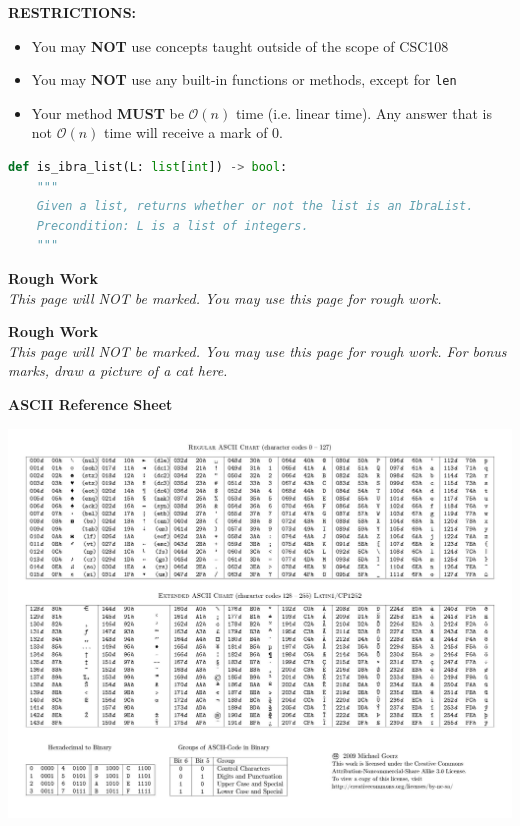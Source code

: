 \documentclass[letterpaper,13pt,addpoints]{exam}
\begin{document}
\begin{questions}
\begin{center}
    \textbf{RESTRICTIONS:}
    \begin{itemize}
        \item You may \textbf{NOT} use concepts taught outside of the scope of CSC108
        \item You may \textbf{NOT} use any built-in functions or methods, except for
              \texttt{len}
        \item Your method \textbf{MUST} be $\mathcal{O}(n)$ time (i.e. linear time). Any
              answer that is not $\mathcal{O}(n)$ time will receive a mark of 0.
    \end{itemize}
    \begin{lstlisting}[language=Python, style=mystyle]
def is_ibra_list(L: list[int]) -> bool:
    """
    Given a list, returns whether or not the list is an IbraList.
    Precondition: L is a list of integers.
    """
\end{lstlisting}
\end{center}
\end{questions}

\clearpage
\begin{center}
    \textbf{Rough Work}\\
    \textit{This page will NOT be marked. You may use this page for rough work.}
\end{center}

\clearpage
\begin{center}
    \textbf{Rough Work}\\
    \textit{This page will NOT be marked. You may use this page for rough work. For bonus marks, draw a picture of a cat here.}

\end{center}
\clearpage
\begin{center}
    \textbf{ASCII Reference Sheet}

    \includegraphics[width=0.8\textheight, angle=270]{ascii.jpg}
\end{center}
\end{document}
